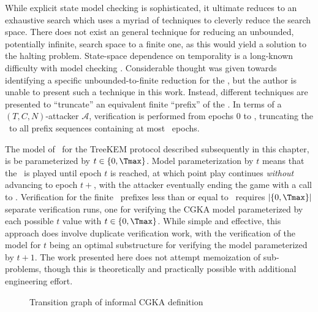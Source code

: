 While explicit state model checking is sophisticated, it ultimate reduces to an exhaustive search which uses a myriad of techniques to cleverly reduce the search space.
There does not exist an general technique for reducing an unbounded, potentially infinite, search space to a finite one, as this would yield a solution to the halting problem.
State-space dependence on temporality is a long-known difficulty with model checking \autocite{henzinger1994symbolic}.
Considerable thought was given towards identifying a specific unbounded-to-finite reduction for the \CGKAsec, but the author is unable to present such a technique in this work.
Instead, different techniques are presented to ``truncate'' an equivalent finite ``prefix'' of the \CGKAsec.
In terms of a \((T, C, N)\)-attacker \(\mathcal{A}\), verification is performed from epochs $0$ to \Tmax, truncating the \CGKAsec\ to all prefix sequences containing at most \Tmax\ epochs.

The model of \CGKAsec\ for the TreeKEM protocol described subsequently in this chapter, is be parameterized by $t \in \{ 0, \Tmax \}$.
Model parameterization by $t$ means that the \CGKAsec\ is played until epoch $t$ is reached, at which point play continues \emph{without} advancing to epoch $t+$, with the attacker eventually ending the game with a call to .
Verification for the finite \CGKAsec\ prefixes less than or equal to \Tmax\ requires $|\{ 0, \Tmax \}|$ separate verification runs, one for verifying the CGKA model parameterized by each possible $t$ value with $t \in \{ 0, \Tmax \}$.
While simple and effective, this approach does involve duplicate verification work, with the verification of the model for $t$ being an optimal substructure for verifying the model parameterized by $t+1$.
The work presented here does not attempt memoization of sub-problems, though this is theoretically and practically possible with additional engineering effort.

\begin{figure}
  \centering
  \caption{\label{fig:CGKA-informal}Transition graph of informal CGKA definition}
\end{figure}



